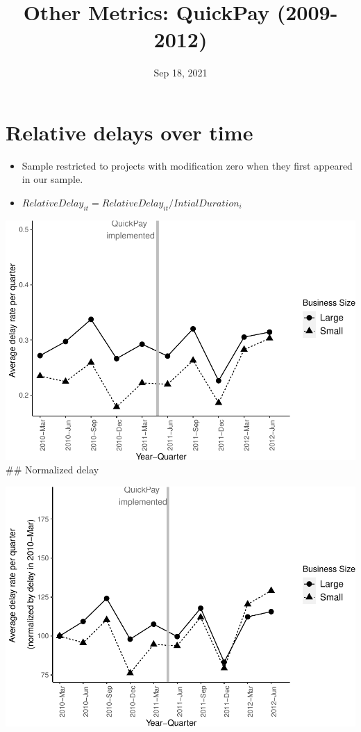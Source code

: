 \documentclass[
]{article}
\title{Other Metrics: QuickPay (2009-2012)}
\author{}
\date{\vspace{-2.5em}Sep 18, 2021}
\begin{document}
\maketitle

\hypertarget{relative-delays-over-time}{%
\section{Relative delays over time}\label{relative-delays-over-time}}

\begin{itemize}
\item
  Sample restricted to projects with modification zero when they first
  appeared in our sample.
\item
  \(RelativeDelay_{it} = RelativeDelay_{it}/IntialDuration_i\)
\end{itemize}

\includegraphics{qp_first_relative_delay_files/figure-latex/plot_relative_delay-1.pdf}
\#\# Normalized delay

\includegraphics{qp_first_relative_delay_files/figure-latex/normalized_plot-1.pdf}
\end{document}
